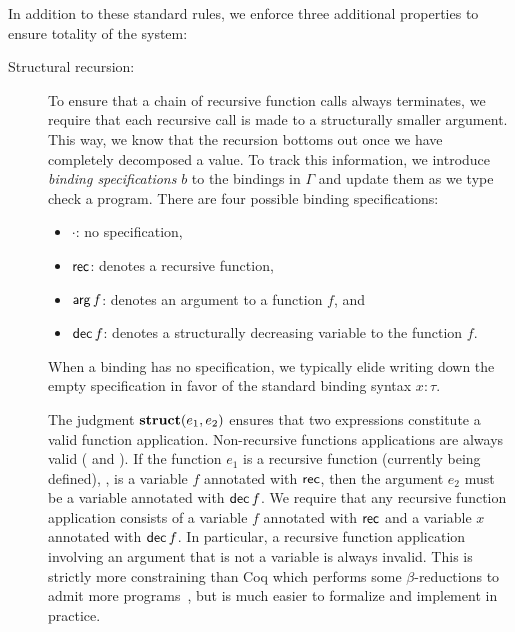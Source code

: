 In addition to these standard rules, we enforce three additional properties to ensure totality of the system:
\begin{description}
  \item[Structural recursion:]
    To ensure that a chain of recursive function calls always terminates, we require that each recursive call is made to a structurally smaller argument.
    This way, we know that the recursion bottoms out once we have completely decomposed a value.
    To track this information, we introduce \emph{binding specifications} $b$ to the bindings in $Γ$ and update them as we type check a program.
    There are four possible binding specifications:
    \begin{itemize}
      \item $·$: no specification,
      \item $\mathsf{rec}$: denotes a recursive function,
      \item $\mathsf{arg}\,f$: denotes an argument to a function $f$, and
      \item $\mathsf{dec}\,f$: denotes a structurally decreasing variable to the function $f$.
    \end{itemize}
    When a binding has no specification, we typically elide writing down the empty specification in favor of the standard binding syntax $x{:}τ$.

    The judgment $\mathbf{struct}(e_1, e_2)$ ensures that two expressions constitute a valid function application.
    Non-recursive functions applications are always valid ( and ).
    If the function $e_1$ is a recursive function (currently being defined), \ie, is a variable $f$ annotated with $\mathsf{rec}$, then the argument $e_2$ must be a variable annotated with $\mathsf{dec}\,f$.
    We require that any recursive function application consists of a variable $f$ annotated with $\mathsf{rec}$ and a variable $x$ annotated with $\mathsf{dec}\,f$.
    In particular, a recursive function application involving an argument that is not a variable is always invalid.
    This is strictly more constraining than Coq which performs some $β$-reductions to admit more programs~, but is much easier to formalize and implement in practice.


\end{description}
